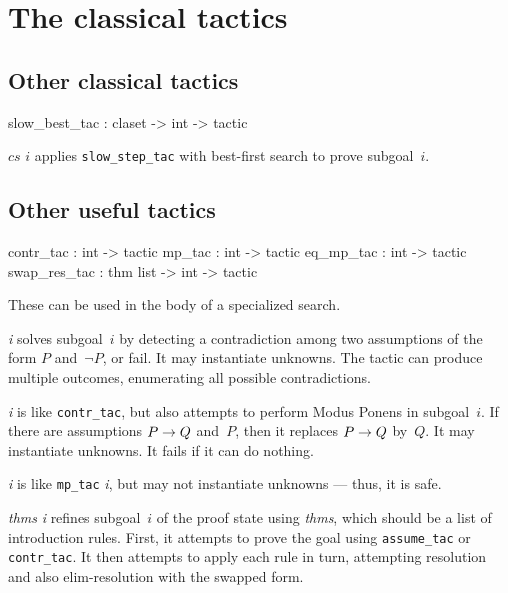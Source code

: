 \section{The classical tactics}

\subsection{Other classical tactics}
\begin{ttbox} 
slow_best_tac : claset -> int -> tactic
\end{ttbox}

\begin{ttdescription}
\item[\ttindexbold{slow_best_tac} $cs$ $i$] applies \texttt{slow_step_tac} with
best-first search to prove subgoal~$i$.
\end{ttdescription}


\subsection{Other useful tactics}
\begin{ttbox} 
contr_tac    :             int -> tactic
mp_tac       :             int -> tactic
eq_mp_tac    :             int -> tactic
swap_res_tac : thm list -> int -> tactic
\end{ttbox}
These can be used in the body of a specialized search.
\begin{ttdescription}
\item[\ttindexbold{contr_tac} {\it i}]
  solves subgoal~$i$ by detecting a contradiction among two assumptions of
  the form $P$ and~$\neg P$, or fail.  It may instantiate unknowns.  The
  tactic can produce multiple outcomes, enumerating all possible
  contradictions.

\item[\ttindexbold{mp_tac} {\it i}] 
is like \texttt{contr_tac}, but also attempts to perform Modus Ponens in
subgoal~$i$.  If there are assumptions $P\rightarrow Q$ and~$P$, then it replaces
$P\rightarrow Q$ by~$Q$.  It may instantiate unknowns.  It fails if it can do
nothing.

\item[\ttindexbold{eq_mp_tac} {\it i}] 
is like \texttt{mp_tac} {\it i}, but may not instantiate unknowns --- thus, it
is safe.

\item[\ttindexbold{swap_res_tac} {\it thms} {\it i}] refines subgoal~$i$ of
the proof state using {\it thms}, which should be a list of introduction
rules.  First, it attempts to prove the goal using \texttt{assume_tac} or
\texttt{contr_tac}.  It then attempts to apply each rule in turn, attempting
resolution and also elim-resolution with the swapped form.
\end{ttdescription}


